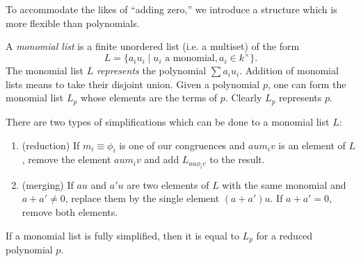 To accommodate the likes of ``adding zero,'' we introduce a structure which is more flexible than polynomials.
\begin{defn}
	A \emph{monomial list} is a finite unordered list (i.e. a multiset) of the form
	\[
	L = \{a_i u_i \mid u_i \text{ a monomial}, a_i \in k^\times\}.
	\]
	The monomial list $L$ \emph{represents} the polynomial $\sum a_i u_i$. Addition of monomial lists means to take their disjoint union. Given a polynomial $p$, one can form the monomial list $L_p$ whose elements are the terms of $p$. Clearly $L_p$ represents $p$.
\end{defn}
There are two types of simplifications which can be done to a monomial list $L$:
\begin{enumerate}
	\item (reduction) If $m_i \equiv \phi_i$ is one of our congruences and $aum_iv$ is an element of $L$, remove the element $aum_iv$ and add $L_{au\phi_iv}$ to the result.
	\item (merging) If $au$ and $a'u$ are two elements of $L$ with the same monomial and $a+a' \neq 0$, replace them by the single element $(a+a')u$. If $a+a' = 0$, remove both elements.
\end{enumerate}
If a monomial list is fully simplified, then it is equal to $L_{p}$ for a reduced polynomial $p$.

